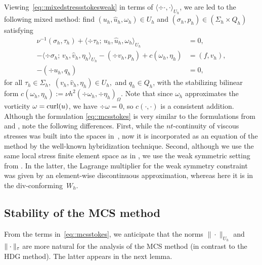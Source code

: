 Viewing~\eqref{eq::mixedstressstokesweak} in terms of 
$\langle \div \cdot, \cdot \rangle_{U_h}$, we are
led to the following mixed method: find
$(u_h, \hat u_h, \omega_h) \in U_h$ and
$ (\sigma_h,p_h) \in (\Sigma_h \times Q_h)$ satisfying 
 \begin{subequations} \label{eq::mcsstokes}
    \begin{alignat}{2} 
      {\nu}^{-1}(\sigma_h, \tau_h) + \langle \div\tau_h; \,
      u_h,\hat u_h, \omega_h \rangle_{U_h} &= 0, \\
      -\langle \div\sigma_h; \,v_h,\hat v_h, \eta_h \rangle_{U_h}
      -(\div v_h, p_h) +  c(\omega_h,\eta_h)&= (f,v_h),
      \\
     -(\div u_h, q_h) &= 0,
   \end{alignat}
 \end{subequations}
 for all $\tau_h \in \Sigma_h,$ $(v_h, \hat v_h, \eta_h) \in U_h,$ and
 $q_h \in Q_h$,
 with the stabilizing bilinear form $c(\omega_h,\eta_h):= \nu h^2
 (\div \omega_h, \div \eta_h)_\Omega$. Note that since $\omega_h$
 approximates the vorticity $\omega = \operatorname{curl}(u)$, we have
 $\div \omega=0$, so $c(\cdot, \cdot)$ is a consistent addition.
 Although the formulation \eqref{eq::mcsstokes} is very similar to the
 formulations from \cite{mcsI} and \cite{mcsII}, note the following
 differences. First, while the $nt$-continuity of viscous stresses was
 built into the spaces in~\cite{mcsI,mcsII}, now it is incorporated as
 an equation of the method by the well-known hybridization
 technique.  Second, although we use the same local
 stress finite element space as in \cite{mcsI}, we use the
 weak symmetric setting from \cite{mcsII}. In the latter, the Lagrange
 multiplier for the weak symmetry constraint was given by an
 element-wise discontinuous approximation, whereas here it is in 
 the div-conforming~$W_h$.

\subsection{Stability of the MCS method}

From the terms in~\eqref{eq::mcsstokes}, we anticipate that the norms
$\| \cdot \|_{U_h}$ and $\| \cdot \|_\varepsilon$ are more natural for the
analysis of the MCS method (in contrast to the HDG method).
The latter appears in the next lemma.


